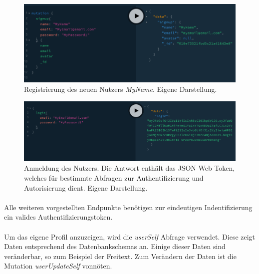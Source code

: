 \begin{figure}
	\centering
    \includegraphics[width=\textwidth]{sources/graphiql_signup.png}
	\caption{Registrierung des neuen Nutzers \textit{MyName}. Eigene Darstellung.}
	\label{fig:gql:2}
\end{figure}

\begin{figure}
	\centering
    \includegraphics[width=\textwidth]{sources/graphiql_login.png}
	\caption{Anmeldung des Nutzers. Die Antwort enthält das JSON Web Token, welches für bestimmte Abfragen zur Authentifizierung und Autorisierung dient. Eigene Darstellung.}
	\label{fig:gql:3}
\end{figure}

\paragraph{}
Alle weiteren vorgestellten Endpunkte benötigen zur eindeutigen Indentifizierung ein valides Authentifizierungstoken.

\paragraph{}
Um das eigene Profil anzuzeigen, wird die \textit{userSelf} Abfrage verwendet.
Diese zeigt Daten entsprechend des Datenbankschemas an.
Einige dieser Daten sind veränderbar, so zum Beispiel der Freitext.
Zum Verändern der Daten ist die Mutation \textit{userUpdateSelf} vonnöten.

